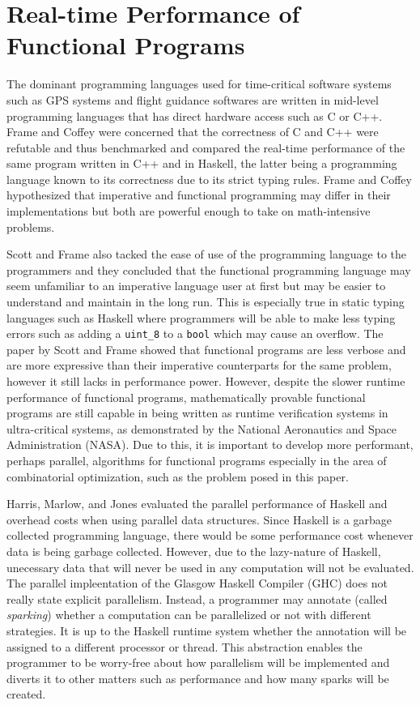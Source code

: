 \section{Real-time Performance of Functional Programs}
The dominant programming languages used for time-critical software systems such as GPS systems and flight guidance softwares 
are written in mid-level programming languages that has direct hardware access such as C or C++. Frame and Coffey were concerned that 
the correctness of C and C++ were refutable and thus benchmarked and compared the real-time performance of the same 
program written in C++ and in Haskell, the latter being a programming language known to its correctness due to its strict typing rules.\cite{Frame2014}
Frame and Coffey hypothesized that imperative and functional programming may differ in their implementations but both are powerful enough to 
take on math-intensive problems.

Scott and Frame also tacked the ease of use of the programming language to the programmers and they concluded that 
the functional programming language may seem unfamiliar to an imperative language user at first but may be easier to 
understand and maintain in the long run.\cite{Frame2014} This is especially true in static typing languages such as Haskell 
where programmers will be able to make less typing errors such as adding a \verb|uint_8| to a \verb|bool| which may cause an overflow.\cite{Hanenberg2014}
The paper by Scott and Frame showed that functional programs are less verbose and are more expressive than their imperative counterparts 
for the same problem, however it still lacks in performance power. However, despite the slower runtime performance of functional programs, mathematically 
provable functional programs are still capable in being written as runtime verification systems in ultra-critical systems, as 
demonstrated by the National Aeronautics and Space Administration (NASA).\cite{NasaCopilot2020} Due to this, it is 
important to develop more performant, perhaps parallel, algorithms for functional programs especially in the area of 
combinatorial optimization, such as the problem posed in this paper.

Harris, Marlow, and Jones evaluated the parallel performance of Haskell and overhead costs when using parallel data structures.
Since Haskell is a garbage collected programming language, there would be some performance cost whenever data is being garbage collected.
However, due to the lazy-nature of Haskell, unecessary data that will never be used in any computation will not be evaluated.
The parallel impleentation of the Glasgow Haskell Compiler (GHC) does not really state explicit parallelism. Instead, a programmer may 
annotate (called \emph{sparking}) whether a computation can be parallelized or not with different strategies. 
It is up to the Haskell runtime system whether the annotation will be assigned to a different processor or thread. 
This abstraction enables the programmer to be worry-free about how parallelism will be implemented and diverts it to 
other matters such as performance and how many sparks will be created.\cite{Harris2005,Marlow2009} 

